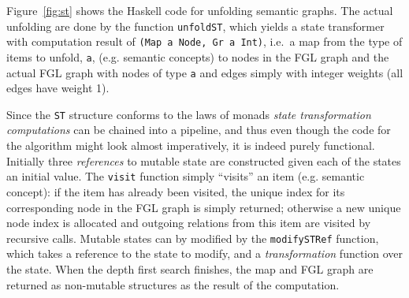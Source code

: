 Figure~\ref{fig:st} shows the Haskell code for unfolding semantic graphs. The actual unfolding are done by the function \texttt{unfoldST}, which yields a state transformer with computation result of \texttt{(Map a Node, Gr a Int)}, i.e.\ a map from the type of items to unfold, \texttt{a}, (e.g. semantic concepts) to nodes in the FGL graph and the actual FGL graph with nodes of type \texttt{a} and edges simply with integer weights (all edges have weight 1).

Since the \texttt{ST} structure conforms to the laws of monads \emph{state transformation computations} can be chained into a pipeline, and thus even though the code for the algorithm might look almost imperatively, it is indeed purely functional. Initially three \emph{references} to mutable state are constructed given each of the states an initial value. The \texttt{visit} function simply ``visits'' an item (e.g. semantic concept): if the item has already been visited, the unique index for its corresponding node in the FGL graph is simply returned; otherwise a new unique node index is allocated and outgoing relations from this item are visited by recursive calls. Mutable states can by modified by the \texttt{modifySTRef} function, which takes a reference to the state to modify, and a \emph{transformation} function over the state. When the depth first search finishes, the map and FGL graph are returned as non-mutable structures as the result of the computation.

